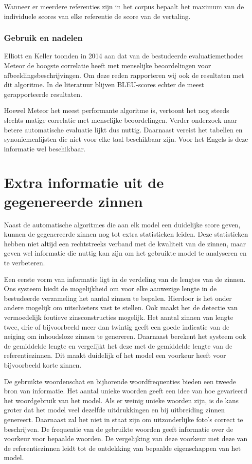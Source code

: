 Wanneer er meerdere referenties zijn in het corpus bepaalt het maximum van de individuele scores van elke referentie de score van de vertaling.

\subsubsection{Gebruik en nadelen}
Elliott en Keller toonden in 2014 aan dat van de bestudeerde evaluatiemethodes Meteor de hoogste correlatie heeft met menselijke beoordelingen voor afbeeldingsbeschrijvingen. Om deze reden rapporteren wij ook de resultaten met dit algoritme. In de literatuur blijven BLEU-scores echter de meest gerapporteerde resultaten.

Hoewel Meteor het meest performante algoritme is, vertoont het nog steeds slechts matige correlatie met menselijke beoordelingen. Verder onderzoek naar betere automatische evaluatie lijkt dus nuttig. Daarnaast vereist het tabellen en synoniemenlijsten die niet voor elke taal beschikbaar zijn. Voor het Engels is deze informatie wel beschikbaar. 


\section{Extra informatie uit de gegenereerde zinnen}
Naast de automatische algoritmes die aan elk model een duidelijke score geven, kunnen de gegenereerde zinnen nog tot extra statistieken leiden. Deze statistieken hebben niet altijd een rechtstreeks verband met de kwaliteit van de zinnen, maar geven wel informatie die nuttig kan zijn om het gebruikte model te analyseren en te verbeteren.

Een eerste vorm van informatie ligt in de verdeling van de lengtes van de zinnen. Ons systeem biedt de mogelijkheid om voor elke aanwezige lengte in de bestudeerde verzameling het aantal zinnen te bepalen. Hierdoor is het onder andere mogelijk om uitschieters vast te stellen. Ook maakt het de detectie van vermoedelijk foutieve zinsconstructies mogelijk. Het aantal zinnen van lengte twee, drie of bijvoorbeeld meer dan twintig geeft een goede indicatie van de neiging om inhoudsloze zinnen te genereren. Daarnaast berekent het systeem ook de gemiddelde lengte en vergelijkt het deze met de gemiddelde lengte van de referentiezinnen. Dit maakt duidelijk of het model een voorkeur heeft voor bijvoorbeeld korte zinnen.

De gebruikte woordenschat en bijhorende woordfrequenties bieden een tweede bron van informatie. Het aantal unieke woorden geeft een idee van hoe gevarieerd het woordgebruik van het model. Als er weinig unieke woorden zijn, is de kans groter dat het model veel dezelfde uitdrukkingen en bij uitbreiding zinnen genereert. Daarnaast zal het niet in staat zijn om uitzonderlijke foto's correct te beschrijven. De frequentie van de gebruikte woorden geeft informatie over de voorkeur voor bepaalde woorden. De vergelijking van deze voorkeur met deze van de referentiezinnen leidt tot de ontdekking van bepaalde eigenschappen van het model.

